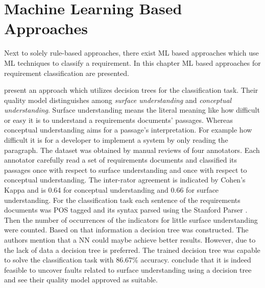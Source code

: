 \section{Machine Learning Based Approaches}
\label{chp:related_research:sec:machine_learingn_based_approaches}

Next to solely rule-based approaches, there exist \ac{ML} based approaches which use \ac{ML} techniques to classify a requirement.
In this chapter \ac{ML} based approaches for requirement classification are presented.

\textcite{Ormandjieva:2007} present an approach which utilizes decision trees for the classification task.
Their quality model distinguishes among \textit{surface understanding} and \textit{conceptual understanding}.
Surface understanding means the literal meaning like how difficult or easy it is to understand a requirements documents' passages.
Whereas conceptual understanding aims for a passage's interpretation.
For example how difficult it is for a developer to implement a system by only reading the paragraph.
The dataset was obtained by manual reviews of four annotators.
Each annotator carefully read a set of requirements documents and classified its passages once with respect to surface understanding and once with respect to conceptual understanding.
The inter-rator agreement is indicated by Cohen's Kappa \parencite{Cohen:1960} and is 0.64 for conceptual understanding and 0.66 for surface understanding.
For the classification task each sentence of the requirements documents was \ac{POS} tagged and its syntax parsed using the Stanford Parser \parencite{Klein:2002}.
Then the number of occurrences of the indicators for little surface understanding were counted.
Based on that information a decision tree was constructed.
The authors mention that a \ac{NN} could maybe achieve better results.
However, due to the lack of data a decision tree is preferred.
The trained decision tree was capable to solve the classification task with 86.67\% accuracy.
\textcite{Ormandjieva:2007} conclude that it is indeed feasible to uncover faults related to surface understanding using a decision tree and see their quality model approved as suitable.
